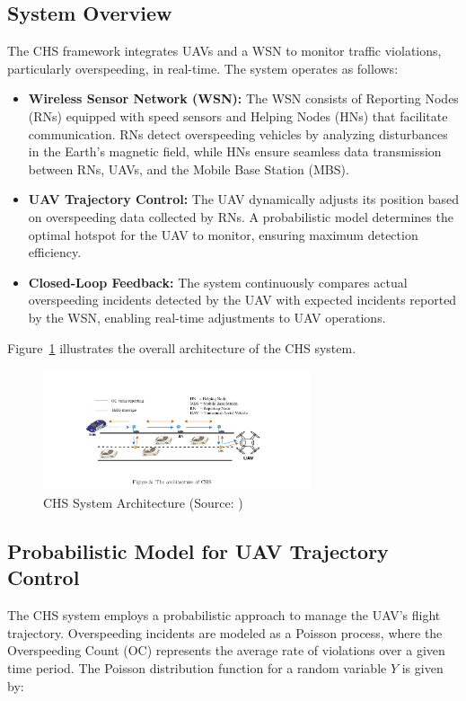 \subsection{System Overview}
The CHS framework integrates UAVs and a WSN to monitor traffic violations, particularly overspeeding, in real-time. The system operates as follows:
\begin{itemize}
    \item \textbf{Wireless Sensor Network (WSN):} The WSN consists of Reporting Nodes (RNs) equipped with speed sensors and Helping Nodes (HNs) that facilitate communication. RNs detect overspeeding vehicles by analyzing disturbances in the Earth's magnetic field, while HNs ensure seamless data transmission between RNs, UAVs, and the Mobile Base Station (MBS).
    \item \textbf{UAV Trajectory Control:} The UAV dynamically adjusts its position based on overspeeding data collected by RNs. A probabilistic model determines the optimal hotspot for the UAV to monitor, ensuring maximum detection efficiency.
    \item \textbf{Closed-Loop Feedback:} The system continuously compares actual overspeeding incidents detected by the UAV with expected incidents reported by the WSN, enabling real-time adjustments to UAV operations.
\end{itemize}

Figure~\ref{fig:chs_architecture} illustrates the overall architecture of the CHS system.

\begin{figure}[h]
    \centering
    \includegraphics[width=0.7\textwidth]{Figures/Chapter3/Method6/1.png}
    \caption{CHS System Architecture (Source: \cite{bashir2022closed})}
    \label{fig:chs_architecture}
\end{figure}

\vspace{\baselineskip} %

\subsection{Probabilistic Model for UAV Trajectory Control}
The CHS system employs a probabilistic approach to manage the UAV’s flight trajectory. Overspeeding incidents are modeled as a Poisson process, where the Overspeeding Count (OC) represents the average rate of violations over a given time period. The Poisson distribution function for a random variable \( Y \) is given by:

